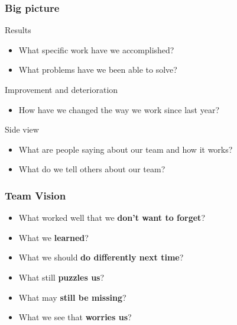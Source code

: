 \documentclass{beamer}
\begin{document}
\begin{frame}
\frametitle{Big picture}

\begin{block}{Results}
    \begin{itemize}
        \item What specific work have we accomplished?
        \item What problems have we been able to solve?
      \end{itemize}
\end{block}

\begin{block}{Improvement and deterioration}
    \begin{itemize}
        \item How have we changed the way we work since last year?
      \end{itemize}
\end{block}

\begin{block}{Side view}
    \begin{itemize}
        \item What are people saying about our team and how it works?
        \item What do we tell others about our team?
      \end{itemize}
\end{block}

\end{frame}

\begin{frame}
\frametitle{Team Vision}

\begin{itemize}
    \item What worked well that we \textbf{don't want to forget}?
    \item What we \textbf{learned}?
    \item What we should \textbf{do differently next time}?
    \item What still \textbf{puzzles us}?
    \item What may \textbf{still be missing}?
    \item What we see that \textbf{worries us}?
\end{itemize}

\end{frame}
\end{document}
